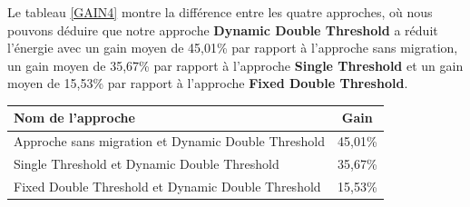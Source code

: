 \begin{onehalfspace}
Le tableau \ref{GAIN4} montre la différence entre les quatre approches, où nous pouvons déduire que notre approche \textbf{Dynamic Double Threshold} a réduit l’énergie avec un gain moyen de 45,01\% par rapport à l'approche sans migration, un gain moyen de 35,67\% par rapport à l'approche \textbf{Single Threshold} et un gain moyen de 15,53\% par rapport à l'approche \textbf{Fixed Double Threshold}.\\


\begin{center}
{\scriptsize   \begin{tabular}{|p{3.5cm}|c|}
\hline
      \centering      Nom de l’approche&  Gain\\
\hline
     \centering       Approche sans migration et Dynamic Double Threshold &  45,01\%\\
\hline
      \centering      Single Threshold et Dynamic Double Threshold&  35,67\%\\
\hline
      \centering      Fixed Double Threshold et Dynamic Double Threshold&  15,53\%\\
\hline
\end{tabular}}
\label{GAIN4}
\end{center}


\end{onehalfspace}
